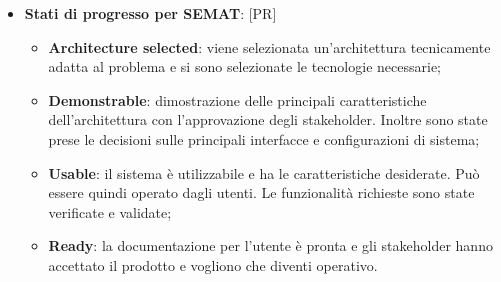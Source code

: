 \begin{itemize}
	\item \textbf{Stati di progresso per SEMAT}: [PR]
		\begin{itemize}
			\item \textbf{Architecture selected}: viene selezionata un'architettura tecnicamente adatta al problema e si sono selezionate le tecnologie necessarie;
			\item \textbf{Demonstrable}: dimostrazione delle principali caratteristiche dell'architettura con l'approvazione degli stakeholder. Inoltre sono state prese le decisioni sulle principali interfacce e configurazioni di sistema;
			\item \textbf{Usable}: il sistema è utilizzabile e ha le caratteristiche desiderate. Può essere quindi operato dagli utenti. Le funzionalità richieste sono state verificate e validate;
			\item \textbf{Ready}: la documentazione per l'utente è pronta e gli stakeholder hanno accettato il prodotto e vogliono che diventi operativo.





\end{itemize}
\end{itemize}
